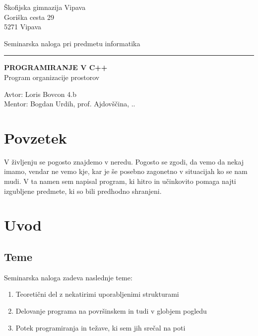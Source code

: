 \documentclass[12pt, a4paper, notitlepage]{article}
\author{Loris Bovcon}
\begin{document}
  \begin{titlepage}

    \flushleft
    Škofijska gimnazija Vipava\\
    Goriška cesta 29\\
    5271 Vipava
    \vspace{1cm}

    \begin{center}
      \large
      Seminarska naloga pri predmetu informatika\\
      \rule{\textwidth}{1pt}
      \vspace{0cm}

      \Huge
      \textbf{
        PROGRAMIRANJE V C++\\
      }
      \Large
      \vspace{0.5cm}
      Program organizacije prostorov
    \end{center}

    \flushright
    \vfill
    Avtor: Loris Bovcon 4.b\\Mentor: Bogdan Urdih, prof.
    \vspace{1cm}
    \center
    Ajdovščina, \the\day.\the\month.\the\year

  \end{titlepage}

  \newpage
  \section{Povzetek}
  V življenju se pogosto znajdemo v neredu. Pogosto se zgodi, da vemo da nekaj imamo, vendar ne vemo kje, kar je še posebno zagonetno v situacijah ko se nam mudi. V ta namen sem napisal program, ki hitro in učinkovito pomaga najti izgubljene predmete, ki so bili predhodno shranjeni.
  
  \newpage
  \tableofcontents
  \listoffigures
  \listoftables
  \newpage


  \justifying
  
  \section{Uvod}
    \subsection{Teme}
  Seminarska naloga zadeva naslednje teme:
  \begin{enumerate}
    \item Teoretični del z nekatirimi uporabljenimi strukturami
    \item Delovanje programa na površinskem in tudi v globjem pogledu
    \item Potek programiranja in težave, ki sem jih srečal na poti
  \end{enumerate}
\end{document}
